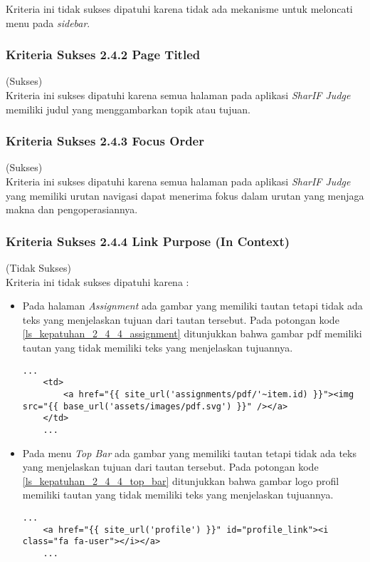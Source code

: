 Kriteria ini tidak sukses dipatuhi karena tidak ada mekanisme untuk meloncati menu pada \textit{sidebar}.

\subsubsection{Kriteria Sukses 2.4.2 Page Titled}
\label{subsubsec:kepatuhan_kriteria_2.4.2}
(Sukses) \\

Kriteria ini sukses dipatuhi karena semua halaman pada aplikasi \textit{SharIF Judge} memiliki judul yang menggambarkan topik atau tujuan.

\subsubsection{Kriteria Sukses 2.4.3 Focus Order}
\label{subsubsec:kepatuhan_kriteria_2.4.3}
(Sukses) \\

Kriteria ini sukses dipatuhi karena semua halaman pada aplikasi \textit{SharIF Judge} yang memiliki urutan navigasi dapat menerima fokus dalam urutan yang menjaga makna dan pengoperasiannya.

\subsubsection{Kriteria Sukses 2.4.4 Link Purpose (In Context)}
\label{subsubsec:kepatuhan_kriteria_2.4.4}
(Tidak Sukses) \\

Kriteria ini tidak sukses dipatuhi karena :
\begin{itemize}
	\item Pada halaman \textit{Assignment} ada gambar yang memiliki tautan tetapi tidak ada teks yang menjelaskan tujuan dari tautan tersebut. Pada potongan kode \ref{ls_kepatuhan_2_4_4_assignment} ditunjukkan bahwa gambar pdf memiliki tautan yang tidak memiliki teks yang menjelaskan tujuannya.
	\begin{lstlisting}[basicstyle=\ttfamily, frame=single,
	columns=fullflexible, keepspaces=true, breaklines=true, label=ls_kepatuhan_2_4_4_assignment, caption=Kriteria Sukses 2.4.4 - Gambar PDF]
	...
	<td>
		<a href="{{ site_url('assignments/pdf/'~item.id) }}"><img src="{{ base_url('assets/images/pdf.svg') }}" /></a>
	</td>
	...
	\end{lstlisting}
	
	\item Pada menu \textit{Top Bar} ada gambar yang memiliki tautan tetapi tidak ada teks yang menjelaskan tujuan dari tautan tersebut. Pada potongan kode \ref{ls_kepatuhan_2_4_4_top_bar} ditunjukkan bahwa gambar logo profil memiliki tautan yang tidak memiliki teks yang menjelaskan tujuannya.
	\begin{lstlisting}[basicstyle=\ttfamily, frame=single,
	columns=fullflexible, keepspaces=true, breaklines=true, label=ls_kepatuhan_2_4_4_top_bar, caption=Kriteria Sukses 2.4.4 - Gambar Logo Profile]
	...
	<a href="{{ site_url('profile') }}" id="profile_link"><i class="fa fa-user"></i></a>
	...
	\end{lstlisting}
	
\end{itemize}

